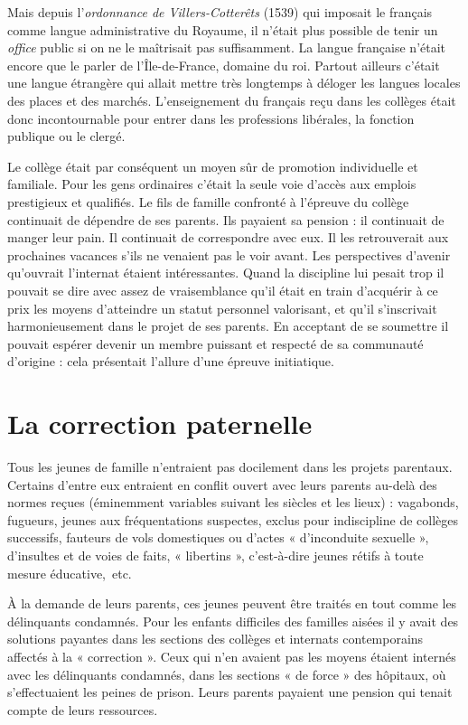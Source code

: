  Mais depuis l'\emph{ordonnance de Villers-Cotterêts} (1539) qui imposait le français comme langue administrative du Royaume, il n'était plus possible de tenir un \emph{office} public si on ne le maîtrisait pas suffisamment. La langue française n'était encore que le parler de l'Île-de-France, domaine du roi. Partout ailleurs c'était une langue étrangère qui allait mettre très longtemps à déloger les langues locales des places et des marchés. L'enseignement du français reçu dans les collèges était donc incontournable pour entrer dans les professions libérales, la fonction publique ou le clergé. 

 Le collège était par conséquent un moyen sûr de promotion individuelle et familiale. Pour les gens ordinaires c'était la seule voie d'accès aux emplois prestigieux et qualifiés. Le fils de famille confronté à l'épreuve du collège continuait de dépendre de ses parents. Ils payaient sa pension : il continuait de manger leur pain. Il continuait de correspondre avec eux. Il les retrouverait aux prochaines vacances s'ils ne venaient pas le voir avant. Les perspectives d'avenir qu'ouvrait l'internat étaient intéressantes. Quand la discipline lui pesait trop il pouvait se dire avec assez de vraisemblance qu'il était en train d'acquérir à ce prix les moyens d'atteindre un statut personnel valorisant, et qu'il s'inscrivait harmonieusement dans le projet de ses parents. En acceptant de se soumettre il pouvait espérer devenir un membre puissant et respecté de sa communauté d'origine : cela présentait l'allure d'une épreuve initiatique. 

\section{La correction paternelle}

 Tous les jeunes de famille n'entraient pas docilement dans les projets parentaux. Certains d'entre eux entraient en conflit ouvert avec leurs parents au-delà des normes reçues (éminemment variables suivant les siècles et les lieux) : vagabonds, fugueurs, jeunes aux fréquentations suspectes, exclus pour indiscipline de collèges successifs, fauteurs de vols domestiques ou d'actes « d'inconduite sexuelle », d'insultes et de voies de faits, « libertins », c'est-à-dire jeunes rétifs à toute mesure éducative,~etc. 

 À la demande de leurs parents, ces jeunes peuvent être traités en tout comme les délinquants con\-dam\-nés. Pour les enfants difficiles des familles aisées il y avait des solutions payantes dans les sections des collèges et internats contemporains affectés à la « correction ». Ceux qui n'en avaient pas les moyens étaient internés avec les délinquants condamnés, dans les sections « de force » des hôpitaux, où s'effectuaient les peines de prison. Leurs parents payaient une pension qui tenait compte de leurs ressources. 

